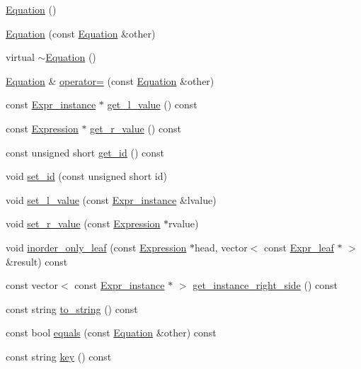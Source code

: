 \begin{CompactItemize}
\item 
\hyperlink{classgenevalmag_1_1Equation_76d5ce9bfc75bcf3cee68e133d1d4faf}{Equation} ()
\item 
\hyperlink{classgenevalmag_1_1Equation_82897cc7187c5c6f8cf1552387856f0f}{Equation} (const \hyperlink{classgenevalmag_1_1Equation}{Equation} \&other)
\item 
virtual \hyperlink{classgenevalmag_1_1Equation_6b4b11ce2cb5bb1f6dfaa2257ef0fe97}{$\sim$Equation} ()
\item 
\hyperlink{classgenevalmag_1_1Equation}{Equation} \& \hyperlink{classgenevalmag_1_1Equation_eca9e6078293ec3897c64925307d2d71}{operator=} (const \hyperlink{classgenevalmag_1_1Equation}{Equation} \&other)
\item 
const \hyperlink{classgenevalmag_1_1Expr__instance}{Expr\_\-instance} $\ast$ \hyperlink{classgenevalmag_1_1Equation_357a3dbd9331f2c7acb70fce221b3d2a}{get\_\-l\_\-value} () const 
\item 
const \hyperlink{classgenevalmag_1_1Expression}{Expression} $\ast$ \hyperlink{classgenevalmag_1_1Equation_875d86207681edfa874a5fca11a671be}{get\_\-r\_\-value} () const 
\item 
const unsigned short \hyperlink{classgenevalmag_1_1Equation_8cd98a3f0a5e2037431b4d31f55b0fbf}{get\_\-id} () const 
\item 
void \hyperlink{classgenevalmag_1_1Equation_651c8c1bee79e950801a2344fea7cedb}{set\_\-id} (const unsigned short id)
\item 
void \hyperlink{classgenevalmag_1_1Equation_640c6b66f92e52b3554e75f9f9d18243}{set\_\-l\_\-value} (const \hyperlink{classgenevalmag_1_1Expr__instance}{Expr\_\-instance} \&lvalue)
\item 
void \hyperlink{classgenevalmag_1_1Equation_227f26570cf37fe0a3ea83855aaaa423}{set\_\-r\_\-value} (const \hyperlink{classgenevalmag_1_1Expression}{Expression} $\ast$rvalue)
\item 
void \hyperlink{classgenevalmag_1_1Equation_bcc00948998a3828cd1f107afda796b1}{inorder\_\-only\_\-leaf} (const \hyperlink{classgenevalmag_1_1Expression}{Expression} $\ast$head, vector$<$ const \hyperlink{classgenevalmag_1_1Expr__leaf}{Expr\_\-leaf} $\ast$ $>$ \&result) const 
\item 
const vector$<$ const \hyperlink{classgenevalmag_1_1Expr__instance}{Expr\_\-instance} $\ast$ $>$ \hyperlink{classgenevalmag_1_1Equation_81ce870d6ecab8e37d59ed929562e4c8}{get\_\-instance\_\-right\_\-side} () const 
\item 
const string \hyperlink{classgenevalmag_1_1Equation_1daad7e8abb06ec02999ce3e9fc38322}{to\_\-string} () const 
\item 
const bool \hyperlink{classgenevalmag_1_1Equation_ea30f41bb039e1665cdf1a2075435010}{equals} (const \hyperlink{classgenevalmag_1_1Equation}{Equation} \&other) const 
\item 
const string \hyperlink{classgenevalmag_1_1Equation_2aa74b8b1df5b16dd9cc7d457cd7e370}{key} () const 
\end{CompactItemize}
